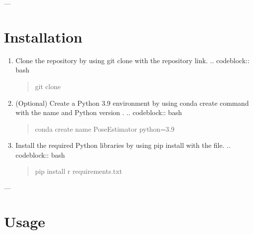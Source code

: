 \documentclass[letterpaper,10pt,english]{sphinxmanual}
\begin{document}
\sphinxAtStartPar
—


\section{Installation}
\label{\detokenize{introduction:installation}}\begin{enumerate}
%
\item {} 
\sphinxAtStartPar
Clone the repository by using git clone with the repository link.
.. code\sphinxhyphen{}block:: bash
\begin{quote}

\sphinxAtStartPar
git clone 
\end{quote}

\item {} 
\sphinxAtStartPar
(Optional) Create a Python 3.9 environment by using conda create command with the name  and Python version .
.. code\sphinxhyphen{}block:: bash
\begin{quote}

\sphinxAtStartPar
conda create \textendash{}name PoseEstimator python=3.9
\end{quote}

\item {} 
\sphinxAtStartPar
Install the required Python libraries by using pip install with the  file.
.. code\sphinxhyphen{}block:: bash
\begin{quote}

\sphinxAtStartPar
pip install \sphinxhyphen{}r requirements.txt
\end{quote}

\end{enumerate}

\sphinxAtStartPar
—


\section{Usage}
\label{\detokenize{introduction:usage}}
\sphinxAtStartPar
{}
\end{document}
